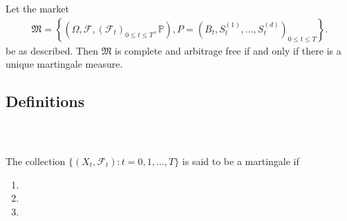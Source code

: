 \documentclass{beamer}
\numberwithin{equation}{section}
\begin{document}
\begin{frame}\frametitle{{\normalsize \secname} \\ {\large \subsecname}}
    \begin{theorem}
        Let the market
        \begin{align*}
            \mathfrak{M} = \left\{ (\Omega, \mathscr{F}, (\mathscr{F}_t)_{0 \leq t \leq T}, \mathbb{P}), P = \left(B_t, S_t^{(1)}, \ldots, S_t^{(d)}\right)_{0 \leq t \leq T} \right\}.
        \end{align*}
        be as described.
        Then $\mathfrak{M}$ is complete and arbitrage free if and only if there is a unique martingale measure.
    \end{theorem}
\end{frame}

\subsection{Definitions}

\begin{frame}\frametitle{{\normalsize \secname} \\ {\large \subsecname}}
    \begin{definition}[Martingale]
        The collection $\{ (X_t, \mathscr{F}_t): t = 0,1, \ldots, T \}$ is said to be a martingale if
        \begin{enumerate}
            \item %
            \item %
            \item %
        \end{enumerate}
    \end{definition}
\end{frame}
\end{document}
